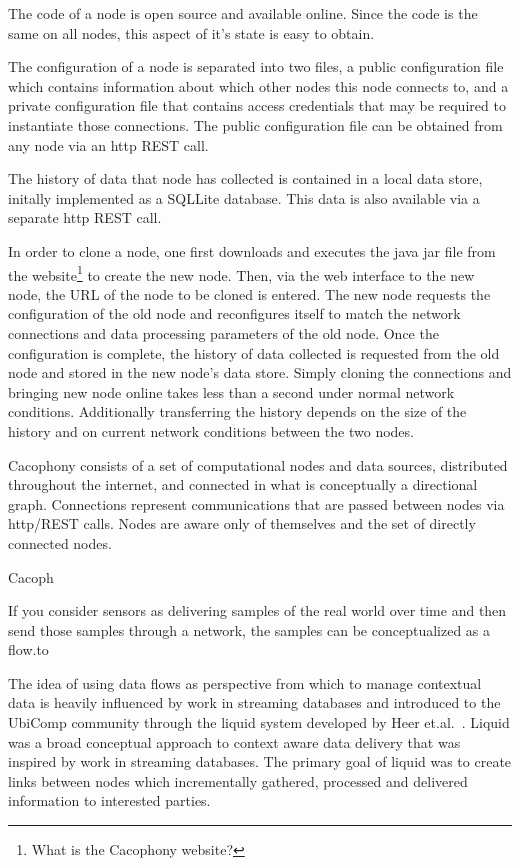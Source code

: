 The code of a \Cacophony node is open source and available online.  Since the
code is the same on all nodes, this aspect of it's state is easy to obtain.

The configuration of a \Cacophony node is separated into two files, a public
configuration file which contains information about which other nodes this node
connects to, and a private configuration file that contains access credentials
that may be required to instantiate those connections.  The public configuration
file can be obtained from any \Cacophony node via an http REST call.

The history of data that \Cacophony node has collected is contained in a local data store, initally
implemented as a SQLLite database.   This data is also available via a separate http
REST call.

In order to clone a \Cacophony node, one first downloads and executes the java
jar file from the \Cacophony website\footnote{What is the Cacophony website?} to
create the new node.
Then, via the web interface to the new node, the URL of the node to be cloned is
entered.  The new node requests the configuration of the old node and
reconfigures itself to match the network connections and data processing
parameters of the old node.  Once the configuration is complete, the history of
data collected is requested from the old node and stored in the new node's data
store.  Simply cloning the connections and bringing new \Cacophony node online takes less than a second under normal
network conditions.  Additionally transferring the history depends on the size
of the history and on current network conditions between the two nodes.






Cacophony consists of a set of computational nodes and data sources, distributed throughout the
internet, and connected in what is conceptually a directional graph.  Connections
represent communications that are passed between nodes via http/REST calls. Nodes are
aware only of themselves and the set of directly connected nodes.







Cacoph

If you consider sensors as delivering samples of the real world over time and
then send those samples through a network, the samples can be conceptualized as
a flow.to 


The idea of using data flows as perspective from which to manage contextual data
is heavily influenced by work in streaming databases and introduced to the
UbiComp community through the liquid system developed by Heer
et.al.~\cite{HeerNBH03}.  Liquid was a broad conceptual approach to context
aware data delivery that was inspired by work in streaming databases.  The
primary goal of liquid was to create links between nodes which incrementally
gathered, processed and delivered information to interested parties.

